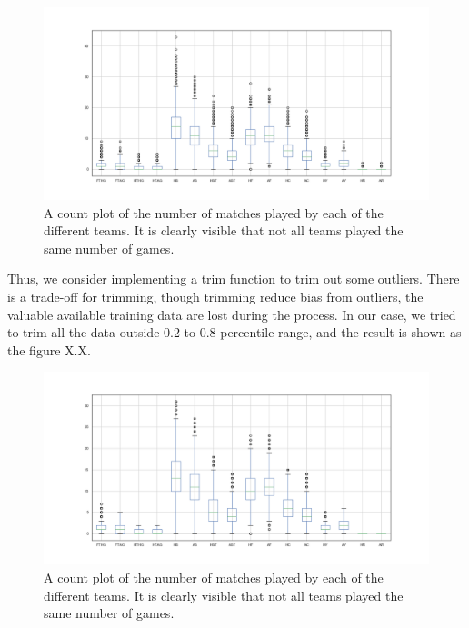 \documentclass[a4paper,12pt]{article}
\begin{document}
	\begin{figure}[H]
		\renewcommand\thefigure{2.3}
		\centering
		
		\includegraphics[scale=0.4]{raw_box_plot.png}
		\caption{A count plot of the number of matches played by each of the different teams. It is clearly visible that not all teams played the same number of games.}
	\end{figure}
	
	Thus, we consider implementing a trim function to trim out some outliers. There is a trade-off for trimming, though trimming reduce bias from outliers, the valuable available training data are lost during the process. In our case, we tried to trim all the data outside 0.2 to 0.8 percentile range, and the result is shown as the figure X.X.
	
	\begin{figure}[H]
		\renewcommand\thefigure{2.3}
		\centering
		
		\includegraphics[scale=0.4]{trimmed_box_plot.png}
		\caption{A count plot of the number of matches played by each of the different teams. It is clearly visible that not all teams played the same number of games.}
	\end{figure}
	
\end{document}
